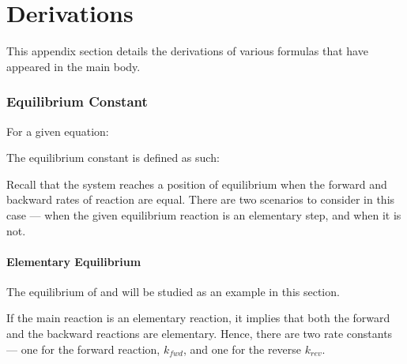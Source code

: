 
\pagebreak
\hypertarget{AppendixDerivations}{}
\part{Derivations}

	This appendix section details the derivations of various formulas that have appeared in the main body.

	\section{Equilibrium Constant}

		For a given equation:


		The equilibrium constant is defined as such:

		\mathdiagram{
			 \[ K_{c} = \frac{[\ch{C}]^{c}[\ch{D}]^{d}}{[\ch{A}]^{a}[\ch{B}]^{b}} \]
		}

		Recall that the system reaches a position of equilibrium when the forward and backward rates of reaction are equal. There are two
		scenarios to consider in this case --- when the given equilibrium reaction is an elementary step, and when it is not.

		\subsection{Elementary Equilibrium}

			The equilibrium of  and  will be studied as an example in this section.


			If the main reaction is an elementary reaction, it implies that both the forward and the backward reactions are elementary. Hence,
			there are two rate constants --- one for the forward reaction, $k_{fwd}$, and one for the reverse $k_{rev}$.

